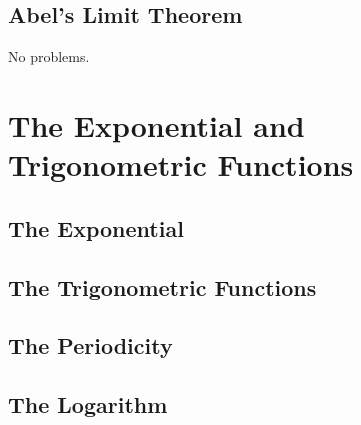 \subsection{Abel's Limit Theorem}

No problems.

\section{The Exponential and Trigonometric Functions}

\subsection{The Exponential}

\subsection{The Trigonometric Functions}

\subsection{The Periodicity}

\subsection{The Logarithm}

